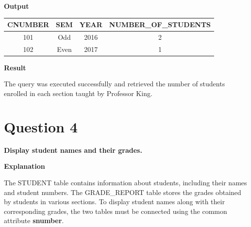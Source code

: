 \documentclass[12pt,a4paper]{report}
\begin{document}
\vspace{0.5cm}

\textbf{Output}

\vspace{0.3cm}

\begin{center}
\renewcommand{\arraystretch}{1.6}
\begin{tabular}{|c|c|c|c|}
\hline
\textbf{CNUMBER} &
\textbf{SEM} &
\textbf{YEAR} &
\textbf{NUMBER\_OF\_STUDENTS} \\
\hline
101 & Odd  & 2016 & 2 \\
\hline
102 & Even & 2017 & 1 \\
\hline
\end{tabular}
\end{center}

\vspace{0.7cm}


\textbf{Result}

The query was executed successfully and retrieved the number of students enrolled in each section taught by Professor King.

\newpage


\vspace{-1cm}

\section*{Question 4}

\textbf{Display student names and their grades.}

\vspace{0.4cm}

\textbf{Explanation}

The STUDENT table contains information about students, including their names and student numbers. The GRADE\_REPORT table stores the grades obtained by students in various sections. To display student names along with their corresponding grades, the two tables must be connected using the common attribute \textbf{snumber}.
\end{document}
